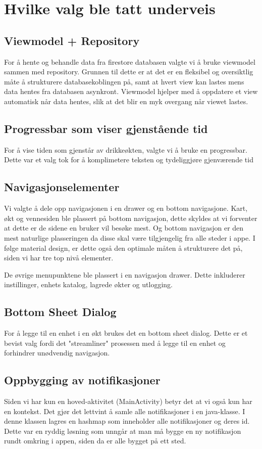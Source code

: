 \section{Hvilke valg ble tatt underveis}
\subsection{Viewmodel + Repository}
For å hente og behandle data fra firestore databasen valgte vi å bruke viewmodel sammen med repository. Grunnen til dette er at det er en fleksibel og oversiktlig måte å strukturere databasekoblingen på, samt at hvert view kan lastes mens data hentes fra databasen asynkront. Viewmodel hjelper med å oppdatere et view automatisk når data hentes, slik at det blir en myk overgang når viewet lastes.

\subsection{Progressbar som viser gjenstående tid}
For å vise tiden som gjenstår av drikkeøkten, valgte vi å bruke en progressbar. Dette var et valg tok for å komplimetere teksten og tydeliggjøre gjenværende tid


\subsection{Navigasjonselementer}
Vi valgte å dele opp navigasjonen i en drawer og en bottom navigasjone. Kart, økt og vennesiden ble plassert på bottom navigasjon, dette skyldes at vi forventer at dette er de sidene en bruker vil besøke mest. Og bottom navigasjon er den mest naturlige plasseringen da disse skal være tilgjengelig fra alle steder i appe. I følge material design, er dette også den optimale måten å strukturere det på, siden vi har tre top nivå elementer. 

De øvrige menupunktene ble plassert i en navigasjon drawer. Dette inkluderer instillinger, enhets katalog, lagrede økter og utlogging. 

\subsection{Bottom Sheet Dialog}
For å legge til en enhet i en økt brukes det en bottom sheet dialog. Dette er et bevist valg fordi det "streamliner" prosessen med å legge til en enhet og forhindrer unødvendig navigasjon.

\subsection{Oppbygging av notifikasjoner}
Siden vi har kun en hoved-aktivitet (MainActivity) betyr det at vi også kun har en kontekst. Det gjør det lettvint å samle alle notifikasjoner i en java-klasse. I denne klassen lagres en hashmap som inneholder alle notifikasjoner og deres id. Dette var en ryddig løsning som unngår at man må bygge en ny notifikasjon rundt omkring i appen, siden da er alle bygget på ett sted.

